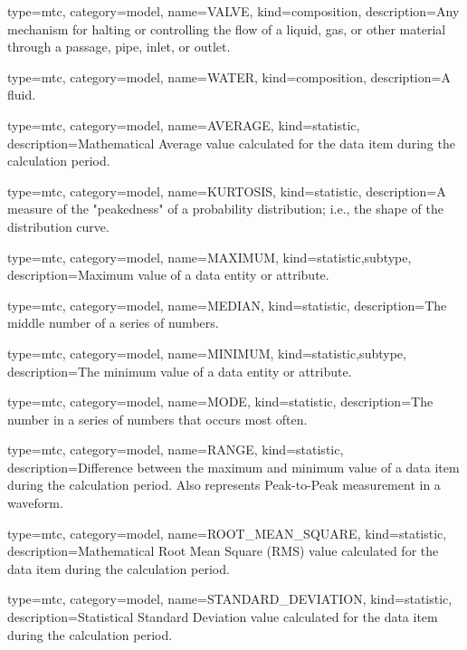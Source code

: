 {
  type=mtc,
  category=model,
  name={VALVE},
  kind={composition},
  description={Any mechanism for halting or controlling the flow of a liquid, gas, or other material through a passage, pipe, inlet, or outlet.}
}


{
  type=mtc,
  category=model,
  name={WATER},
  kind={composition},
  description={A fluid.}
}


{
  type=mtc,
  category=model,
  name={AVERAGE},
  kind={statistic},
  description={Mathematical Average value calculated for the data item during the calculation period.}
}


{
  type=mtc,
  category=model,
  name={KURTOSIS},
  kind={statistic},
  description={A measure of the "peakedness" of a probability distribution; i.e., the shape of the distribution curve.}
}


{
  type=mtc,
  category=model,
  name={MAXIMUM},
  kind={statistic,subtype},
  description={Maximum value of a data entity or attribute.}
}


{
  type=mtc,
  category=model,
  name={MEDIAN},
  kind={statistic},
  description={The middle number of a series of numbers.}
}


{
  type=mtc,
  category=model,
  name={MINIMUM},
  kind={statistic,subtype},
  description={The minimum value of a data entity or attribute.}
}


{
  type=mtc,
  category=model,
  name={MODE},
  kind={statistic},
  description={The number in a series of numbers that occurs most often.}
}


{
  type=mtc,
  category=model,
  name={RANGE},
  kind={statistic},
  description={Difference between the maximum and minimum value of a data item during the calculation period.  Also represents Peak-to-Peak measurement in a waveform.}
}


{
  type=mtc,
  category=model,
  name={ROOT\_MEAN\_SQUARE},
  kind={statistic},
  description={Mathematical Root Mean Square (RMS) value calculated for the data item during the calculation period.}
}


{
  type=mtc,
  category=model,
  name={STANDARD\_DEVIATION},
  kind={statistic},
  description={Statistical Standard Deviation value calculated for the data item during the calculation period.}
}


